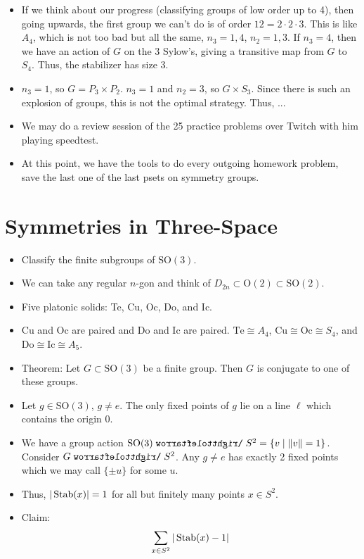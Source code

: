 \documentclass[../notes.tex]{subfiles}
\begin{document}
\begin{itemize}
    \item If we think about our progress (classifying groups of low order up to 4), then going upwards, the first group we can't do is of order $12=2\cdot 2\cdot 3$. This is like $A_4$, which is not too bad but all the same, $n_3=1,4$, $n_2=1,3$. If $n_3=4$, then we have an action of $G$ on the 3 Sylow's, giving a transitive map from $G$ to $S_4$. Thus, the stabilizer has size 3.
    \item $n_3=1$, so $G=P_3\times P_2$. $n_3=1$ and $n_2=3$, so $G\times S_3$. Since there is such an explosion of groups, this is not the optimal strategy. Thus, ...
    \item We may do a review session of the 25 practice problems over Twitch with him playing speedtest.
    \item At this point, we have the tools to do every outgoing homework problem, save the last one of the last psets on symmetry groups.
\end{itemize}



\section{Symmetries in Three-Space}
\begin{itemize}
    \item {}Classify the finite subgroups of $\text{SO}(3)$.
    \item We can take any regular $n$-gon and think of $D_{2n}\subset\text{O}(2)\subset\text{SO}(2)$.
    \item Five platonic solids: Te, Cu, Oc, Do, and Ic.
    \item Cu and Oc are paired and Do and Ic are paired. $\text{Te}\cong A_4$, $\text{Cu}\cong\text{Oc}\cong S_4$, and $\text{Do}\cong\text{Ic}\cong A_5$.
    \item Theorem: Let $G\subset\text{SO}(3)$ be a finite group. Then $G$ is conjugate to one of these groups.
    \item Let $g\in\text{SO}(3)$, $g\neq e$. The only fixed points of $g$ lie on a line $\ell$ which contains the origin 0.
    \item We have a group action $\text{SO}(3)\acts S^2=\{v\mid\norm{v}=1\}$. Consider $G\acts S^2$. Any $g\neq e$ has exactly 2 fixed points which we may call $\{\pm u\}$ for some $u$.
    \item Thus, $|\operatorname{Stab}(x)|=1$ for all but finitely many points $x\in S^2$.
    \item Claim:
    \begin{equation*}
        \sum_{x\in S^2}|\operatorname{Stab}(x)-1|
    \end{equation*}
\end{itemize}
\end{document}
